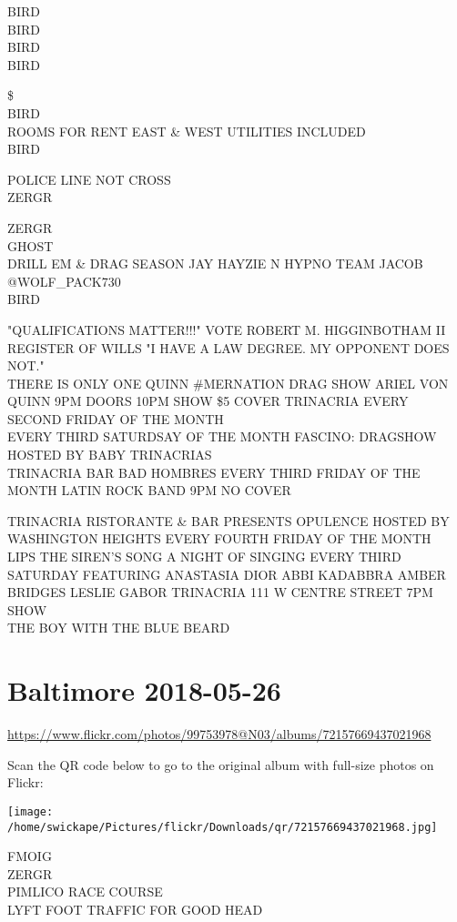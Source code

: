 \documentclass[10pt,letterpaper]{article}
\begin{document}
BIRD\\
BIRD\\
BIRD\\
BIRD

\$\\
BIRD\\
ROOMS FOR RENT EAST \& WEST UTILITIES INCLUDED\\
BIRD

POLICE LINE NOT CROSS\\
ZERGR

ZERGR\\
GHOST\\
DRILL EM \& DRAG SEASON JAY HAYZIE N HYPNO TEAM JACOB @WOLF\_PACK730\\
BIRD

"QUALIFICATIONS MATTER!!!" VOTE ROBERT M. HIGGINBOTHAM II REGISTER OF WILLS "I HAVE A LAW DEGREE.  MY OPPONENT DOES NOT."\\
THERE IS ONLY ONE QUINN \#MERNATION DRAG SHOW ARIEL VON QUINN 9PM DOORS 10PM SHOW \$5 COVER TRINACRIA EVERY SECOND FRIDAY OF THE MONTH\\
EVERY THIRD SATURDSAY OF THE MONTH FASCINO: DRAGSHOW HOSTED BY BABY TRINACRIAS\\
TRINACRIA BAR BAD HOMBRES EVERY THIRD FRIDAY OF THE MONTH LATIN ROCK BAND 9PM NO COVER

TRINACRIA RISTORANTE \& BAR PRESENTS OPULENCE HOSTED BY WASHINGTON HEIGHTS EVERY FOURTH FRIDAY OF THE MONTH\\
LIPS THE SIREN'S SONG A NIGHT OF SINGING EVERY THIRD SATURDAY FEATURING ANASTASIA DIOR ABBI KADABBRA AMBER BRIDGES LESLIE GABOR TRINACRIA 111 W CENTRE STREET 7PM SHOW\\
THE BOY WITH THE BLUE BEARD
\pagebreak

\section*{Baltimore 2018-05-26}

\url{https://www.flickr.com/photos/99753978@N03/albums/72157669437021968}

Scan the QR code below to go to the original album with full-size photos on Flickr:

\texttt{[image: /home/swickape/Pictures/flickr/Downloads/qr/72157669437021968.jpg]}
\pagebreak

FMOIG\\
ZERGR\\
PIMLICO RACE COURSE\\
LYFT FOOT TRAFFIC FOR GOOD HEAD
\end{document}
